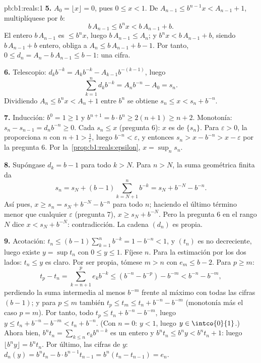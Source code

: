 \begin{solution}{pb:b1:reals:1}
\textbf{5.} $A_0 = \lfloor x \rfloor = 0$, pues $0 \leq x < 1$. De
$A_{n-1} \leq b^{n-1} x < A_{n-1} + 1$, multiplíquese por $b$:
\[
b\,A_{n-1} \leq b^n x < b\,A_{n-1} + b .
\]
El entero $b\,A_{n-1}$ es $\leq b^n x$, luego $b\,A_{n-1} \leq A_n$; y
$b^n x < b\,A_{n-1} + b$, siendo $b\,A_{n-1} + b$ entero, obliga a
$A_n \leq b\,A_{n-1} + b - 1$. Por tanto,
$0 \leq d_n = A_n - b\,A_{n-1} \leq b - 1$: una cifra.

\textbf{6.} Telescopio: $d_k b^{-k} = A_k b^{-k} - A_{k-1}
b^{-(k-1)}$, luego
\[
\sum_{k=1}^n d_k b^{-k} = A_n b^{-n} - A_0 = s_n .
\]
Dividiendo $A_n \leq b^n x < A_n + 1$ entre $b^n$ se obtiene
$s_n \leq x < s_n + b^{-n}$.

\textbf{7.} Inducción: $b^0 = 1 \geq 1$ y $b^{n+1} = b \cdot b^n \geq
2(n + 1) \geq n + 2$. Monotonía: $s_n - s_{n-1} = d_n b^{-n} \geq 0$.
Cada $s_n \leq x$ (pregunta 6): $x$ es  de $\{s_n\}$.
Para $\varepsilon > 0$, la  proporciona $n$ con
$n + 1 > \frac1\varepsilon$, luego $b^{-n} < \varepsilon$, y entonces
$s_n > x - b^{-n} > x - \varepsilon$ por la pregunta 6. Por
la~\cref{prop:b1:reals:epsilon}, $x = \sup_n s_n$.

\textbf{8.} Supóngase $d_k = b - 1$ para todo $k > N$. Para $n > N$,
la suma geométrica finita da
\[
s_n = s_N + (b - 1)\sum_{k=N+1}^{n} b^{-k}
= s_N + b^{-N} - b^{-n} .
\]
Así pues, $x \geq s_n = s_N + b^{-N} - b^{-n}$ para todo $n$; haciendo
el último término menor que cualquier $\varepsilon$ (pregunta 7),
$x \geq s_N + b^{-N}$. Pero la pregunta 6 en el rango $N$ dice
$x < s_N + b^{-N}$: contradicción. La cadena $(d_n)$ es propia.

\textbf{9.} Acotación: $t_n \leq (b-1)\sum_{k=1}^n b^{-k} = 1 -
b^{-n} < 1$, y $(t_n)$ es no decreciente, luego existe $y = \sup t_n$
con $0 \leq y \leq 1$. Fíjese $n$. Para la estimación por los dos
lados: $t_n \leq y$ es claro. Por ser propia, tómese $m > n$ con
$e_m \leq b - 2$. Para $p \geq m$:
\[
t_p - t_n = \sum_{k=n+1}^{p} e_k b^{-k}
\leq (b^{-n} - b^{-p}) - b^{-m} < b^{-n} - b^{-m},
\]
perdiendo la suma intermedia al menos $b^{-m}$ frente al máximo con
todas las cifras $(b-1)$; y para $p \leq m$ también
$t_p \leq t_m \leq t_n + b^{-n} - b^{-m}$ (monotonía más el caso
$p = m$). Por tanto, todo $t_p \leq t_n + b^{-n} - b^{-m}$, luego
$y \leq t_n + b^{-n} - b^{-m} < t_n + b^{-n}$. (Con $n = 0$: $y < 1$,
luego $y \in \intco{0}{1}$.) Ahora bien,
$b^n t_n = \sum_{k \leq n} e_k b^{n-k}$ es un entero y
$b^n t_n \leq b^n y < b^n t_n + 1$: luego $\lfloor b^n y \rfloor =
b^n t_n$. Por último, las cifras de $y$: $d_n(y) = b^n t_n - b \cdot
b^{n-1} t_{n-1} = b^n(t_n - t_{n-1}) = e_n$.


\end{solution}
